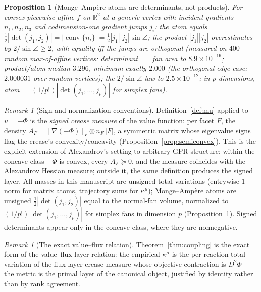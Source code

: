 \documentclass[11pt,a4paper]{article}
\theoremstyle{plain}
\newtheorem{proposition}[theorem]{Proposition}
\theoremstyle{definition}
\theoremstyle{remark}
\newtheorem{remark}[theorem]{Remark}
\newcommand{\kmu}{\kappa^{\mu}}
\newcommand{\RR}{\mathbb{R}}
\begin{document}
\begin{proposition}[Monge--Amp\`ere atoms are determinants, not
products]\label{prop:maatom}
For convex piecewise-affine $f$ on $\RR^2$ at a generic vertex with
incident gradients $n_1, n_2, n_3$ and codimension-one gradient jumps
$j_i$: the atom equals
$\tfrac12|\det(j_1, j_2)| =
|\operatorname{conv}\{n_i\}| =
\tfrac12 |j_1| |j_2| \sin\angle$; the product $|j_1||j_2|$
overestimates by $2/\sin\angle \ge 2$, with equality iff the jumps
are orthogonal (measured on $400$ random max-of-affine vertices:
determinant $=$ fan area to $8.9 \times 10^{-16}$; product/atom
median $3.296$, minimum exactly $2.000$ (the orthogonal edge case;
$2.000031$ over random vertices); the $2/\sin\angle$ law to
$2.5 \times 10^{-12}$; in $p$ dimensions, atom $=
(1/p!)|\det(j_1,\dots,j_p)|$ for simplex fans).
\end{proposition}

\begin{remark}[Sign and normalization conventions]\label{rem:conventions}
Definition~\ref{def:mu} applied to $u = -\Phi$ is the \emph{signed
crease measure} of the value function: per facet $F$, the density
$A_F = [\nabla(-\Phi)]_F \otimes n_F\,|F|$, a symmetric matrix whose
eigenvalue signs flag the crease's convexity/concavity
(Proposition~\ref{prop:semiconvex}). This is the explicit extension
of Alexandrov's setting to arbitrary GPR structure: within the
concave class $-\Phi$ is convex, every $A_F \succeq 0$, and the
measure coincides with the Alexandrov Hessian measure; outside it,
the same definition produces the signed layer. All masses in this
manuscript are unsigned total variations (entrywise $1$-norm for
matrix atoms, trajectory sums for $\kmu$); Monge--Amp\`ere atoms are
unsigned $\tfrac12|\det(j_1, j_2)|$ equal to the normal-fan volume,
normalized to $(1/p!)|\det(j_1,\dots,j_p)|$ for simplex fans in
dimension $p$ (Proposition~\ref{prop:maatom}). Signed determinants
appear only in the concave class, where they are nonnegative.
\end{remark}

\begin{remark}[The exact value--flux relation]\label{rem:closes}
Theorem~\ref{thm:coupling} is the exact form of the value--flux layer relation: the empirical $\kmu$ is the
per-reaction total variation of the flux-layer crease measure whose
objective contraction is $D^2\Phi$ --- the metric is the primal
layer of the canonical object, justified by identity rather than by
rank agreement.
\end{remark}
\end{document}
